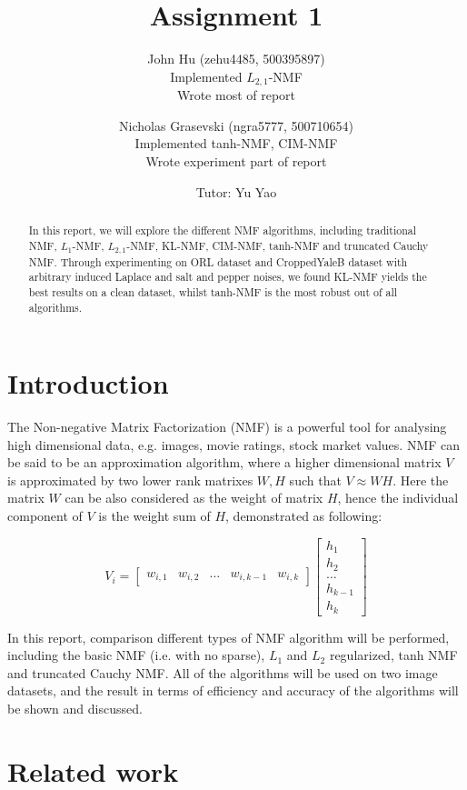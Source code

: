 \documentclass{article} %
\title{Assignment 1}
\author{
  John Hu (zehu4485, 500395897)\\
  Implemented $L_{2,1}$-NMF\\
  Wrote most of report
  \and
  Nicholas Grasevski (ngra5777, 500710654)\\
  Implemented tanh-NMF, CIM-NMF\\
  Wrote experiment part of report
  \and
  Tutor: Yu Yao
}
\begin{document}
\maketitle

\begin{abstract}
In this report, we will explore the different NMF algorithms, including traditional NMF, $L_1$-NMF, $L_{2,1}$-NMF, KL-NMF, CIM-NMF, tanh-NMF and truncated Cauchy NMF. Through experimenting on ORL dataset and CroppedYaleB dataset with arbitrary induced Laplace and salt and pepper noises, we found KL-NMF yields the best results on a clean dataset, whilst tanh-NMF is the most robust out of all algorithms.
\end{abstract}

\section{Introduction}
The Non-negative Matrix Factorization (NMF) is a powerful tool for analysing high dimensional data, e.g. images, movie ratings, stock market values. NMF can be said to be an approximation algorithm, where a higher dimensional matrix $V$ is approximated by two lower rank matrixes $W,H$ such that $V \approx WH$. Here the matrix $W$ can be also considered as the weight of matrix $H$, hence the individual component of $V$ is the weight sum of $H$, demonstrated as following:

\begin{equation}
V_i = \begin{bmatrix}
w_{i,1} & w_{i,2} & \dots & w_{i,k-1} & w_{i,k}
\end{bmatrix} \begin{bmatrix}
h_1\\ 
h_2\\ 
\dots\\ 
h_{k-1}\\ 
h_k
\end{bmatrix}
\end{equation}

In this report, comparison different types of NMF algorithm will be performed, including the basic NMF (i.e. with no sparse), $L_1$ and $L_2$ regularized, tanh NMF and truncated Cauchy NMF. All of the algorithms will be used on two image datasets, and the result in terms of efficiency and accuracy of the algorithms will be shown and discussed.

\section{Related work}
\end{document}
